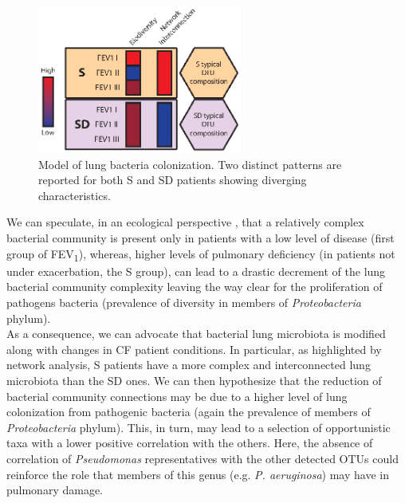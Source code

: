 \begin{figure}[!tb]
	\centering
	\includegraphics[width=0.6\textwidth]{./figures/Chapter_7/Figure_6_16s}
  	\caption{\label{fig:fig616s}Model of lung bacteria colonization. Two distinct patterns are reported for both S and SD patients showing diverging characteristics.}
\end{figure}
We can speculate, in an ecological perspective \cite{conrad2013cystic}, that a relatively complex bacterial community is present only in patients with a low level of disease (first group of FEV\textsubscript{1}), whereas, higher levels of pulmonary deficiency (in patients not under exacerbation, the S group), can lead to a drastic decrement of the lung bacterial community complexity leaving the way clear for the proliferation of pathogens bacteria (prevalence of diversity in members of  \textit{Proteobacteria} phylum).\\
As a consequence, we can advocate that bacterial lung microbiota is modified along with changes in CF patient conditions. In particular, as highlighted by network analysis, S patients have a more complex and interconnected lung microbiota than the SD ones. We can then hypothesize that the reduction of bacterial community connections may be due to a higher level of lung colonization from pathogenic bacteria (again the prevalence of members of \textit{Proteobacteria} phylum). This, in turn, may lead to a selection of opportunistic taxa with a lower positive correlation with the others. Here, the absence of correlation of \textit{Pseudomonas} representatives with the other detected OTUs could reinforce the role that members of this genus (e.g. \textit{P. aeruginosa}) may have in pulmonary damage.\\

\backmatter
{}
\renewcommand{\sectionmark}[1]{\markright{#1}}
\sectionmark{Bibliography}
